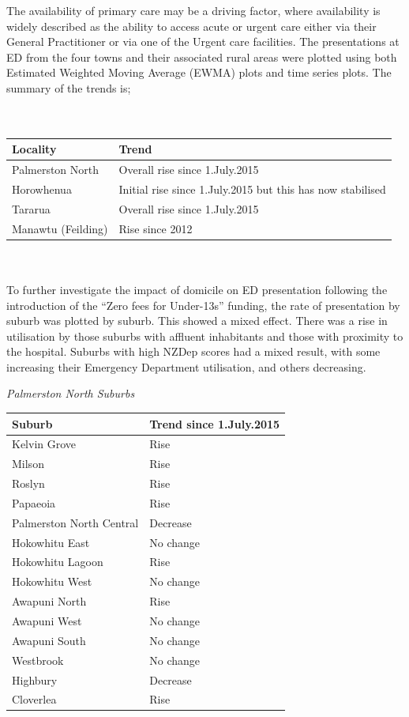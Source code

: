 \documentclass[11pt,a4paper]{article}
\begin{document}
The availability of primary care may be a driving factor, where availability is widely described as the ability to access acute or urgent care either via their General Practitioner or via one of the Urgent care facilities. The presentations at ED from the four towns and their associated rural areas were plotted using both Estimated Weighted Moving Average (EWMA) plots and time series plots. The summary of the trends is;\\ 
\\
\\
\begin{tabular}{|l|l|}
\hline 
        Locality & Trend\\
\hline
        Palmerston North & Overall rise since 1.July.2015\\
\hline
        Horowhenua & Initial rise since 1.July.2015 but this has now stabilised\\
\hline
        Tararua & Overall rise since 1.July.2015\\
\hline
        Manawtu (Feilding) & Rise since 2012\\
\hline
\end{tabular}
\\
\\
To further investigate the impact of domicile on ED presentation following the introduction of the “Zero fees for Under-13s” funding, the rate of presentation by suburb was plotted by suburb. This showed a mixed effect. There was a rise in utilisation by those suburbs with affluent inhabitants and those with proximity to the hospital. Suburbs with high NZDep scores had a mixed result, with some increasing their Emergency Department utilisation, and others decreasing.
\pagebreak


\emph{Palmerston North Suburbs}


\begin{tabular}{|l|l|}
\hline
        Suburb & Trend since 1.July.2015\\
\hline
        Kelvin Grove & Rise\\
\hline
        Milson & Rise\\
\hline
        Roslyn & Rise\\
\hline
        Papaeoia & Rise\\
\hline
        Palmerston North Central & Decrease\\
\hline
        Hokowhitu East & No change\\
\hline
        Hokowhitu Lagoon & Rise\\
\hline
        Hokowhitu West & No change\\
\hline
        Awapuni North & Rise\\
\hline
        Awapuni West & No change\\
\hline
        Awapuni South & No change\\
\hline
        Westbrook & No change\\
\hline
        Highbury & Decrease\\
\hline
        Cloverlea & Rise\\
\hline
\end{tabular}
\\
\\
\end{document}
